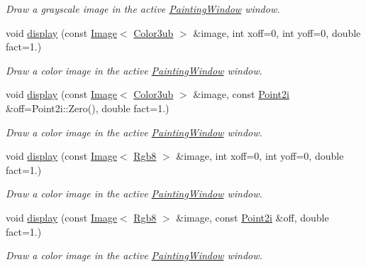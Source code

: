 \begin{DoxyCompactItemize}
\begin{DoxyCompactList}\small\item\em Draw a grayscale image in the active \hyperlink{class_d_o_1_1_painting_window}{Painting\-Window} window. \end{DoxyCompactList}\item 
void \hyperlink{group___draw2_d_ga0e5d4d3aadae2bf37d6faa1e8b84c5e9}{display} (const \hyperlink{class_d_o_1_1_image}{Image}$<$ \hyperlink{group___color_types_ga018b76cd00a4f9dca7dd06246d5bd3aa}{Color3ub} $>$ \&image, int xoff=0, int yoff=0, double fact=1.)
\begin{DoxyCompactList}\small\item\em Draw a color image in the active \hyperlink{class_d_o_1_1_painting_window}{Painting\-Window} window. \end{DoxyCompactList}\item 
void \hyperlink{group___draw2_d_ga0e452fddc5470393c55af60e940bc624}{display} (const \hyperlink{class_d_o_1_1_image}{Image}$<$ \hyperlink{group___color_types_ga018b76cd00a4f9dca7dd06246d5bd3aa}{Color3ub} $>$ \&image, const \hyperlink{group___eigen_typedefs_ga048a27763e58f682b1b91af86144f701}{Point2i} \&off=Point2i\-::\-Zero(), double fact=1.)
\begin{DoxyCompactList}\small\item\em Draw a color image in the active \hyperlink{class_d_o_1_1_painting_window}{Painting\-Window} window. \end{DoxyCompactList}\item 
void \hyperlink{group___draw2_d_gaff59f1e3836248047c31d6cb117ad733}{display} (const \hyperlink{class_d_o_1_1_image}{Image}$<$ \hyperlink{group___color_types_gabba376766e70e08cdaccf69fa903f526}{Rgb8} $>$ \&image, int xoff=0, int yoff=0, double fact=1.)
\begin{DoxyCompactList}\small\item\em Draw a color image in the active \hyperlink{class_d_o_1_1_painting_window}{Painting\-Window} window. \end{DoxyCompactList}\item 
void \hyperlink{group___draw2_d_ga295040f0084e284ebe3a020e10aff55e}{display} (const \hyperlink{class_d_o_1_1_image}{Image}$<$ \hyperlink{group___color_types_gabba376766e70e08cdaccf69fa903f526}{Rgb8} $>$ \&image, const \hyperlink{group___eigen_typedefs_ga048a27763e58f682b1b91af86144f701}{Point2i} \&off, double fact=1.)
\begin{DoxyCompactList}\small\item\em Draw a color image in the active \hyperlink{class_d_o_1_1_painting_window}{Painting\-Window} window. \end{DoxyCompactList}\item 

\end{DoxyCompactItemize}
